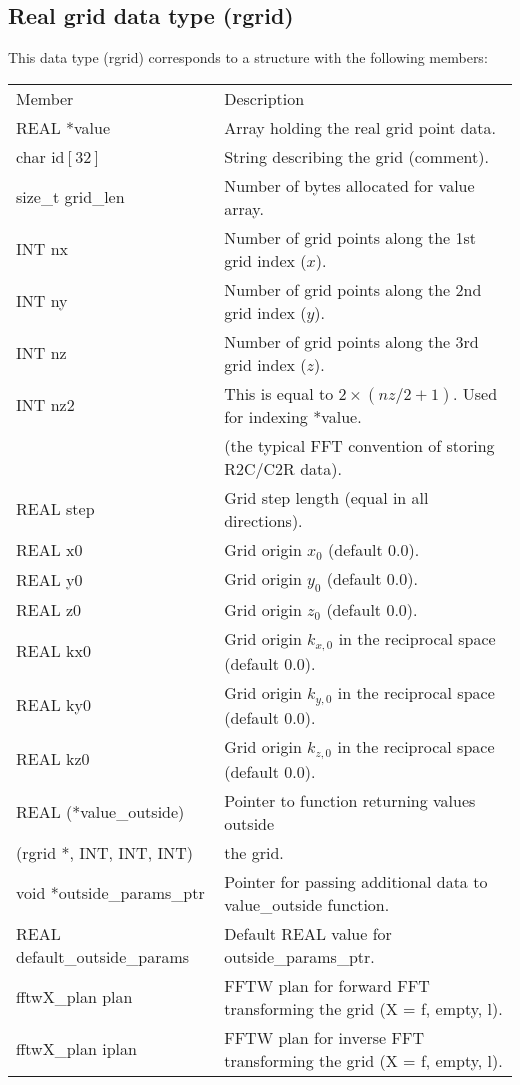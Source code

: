 \documentclass[12pt,letterpaper]{report}
\begin{document}
\subsection{Real grid data type (rgrid)}
This data type (rgrid) corresponds to a structure with the following members:
\begin{longtable}{p{} p{}}
Member & Description\\
\cline{1-2}
REAL *value & Array holding the real grid point data.\\
char id$[32]$ & String describing the grid (comment).\\
size\_t grid\_len & Number of bytes allocated for value array.\\
INT nx & Number of grid points along the 1st grid index ($x$).\\
INT ny & Number of grid points along the 2nd grid index ($y$).\\
INT nz & Number of grid points along the 3rd grid index ($z$).\\
INT nz2 & This is equal to $2\times(nz / 2 + 1)$. Used for indexing *value.\\
        & (the typical FFT convention of storing R2C/C2R data).\\
REAL step & Grid step length (equal in all directions).\\
REAL x0 & Grid origin $x_0$ (default 0.0).\\
REAL y0 & Grid origin $y_0$ (default 0.0).\\
REAL z0 & Grid origin $z_0$ (default 0.0).\\
REAL kx0 & Grid origin $k_{x,0}$ in the reciprocal space (default 0.0).\\
REAL ky0 & Grid origin $k_{y,0}$ in the reciprocal space (default 0.0).\\
REAL kz0 & Grid origin $k_{z,0}$ in the reciprocal space (default 0.0).\\
REAL (*value\_outside) & Pointer to function returning values outside\\
\phantom{X}(rgrid *, INT, INT, INT) & the grid.\\
void *outside\_params\_ptr & Pointer for passing additional data to value\_outside function.\\
REAL default\_outside\_params & Default REAL value for outside\_params\_ptr.\\
fftwX\_plan plan & FFTW plan for forward FFT transforming the grid (X = f, empty, l).\\
fftwX\_plan iplan & FFTW plan for inverse FFT transforming the grid (X = f, empty, l).\\

\end{longtable}
\end{document}
